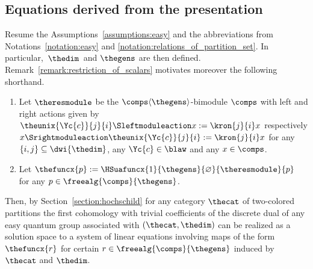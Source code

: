 \documentclass[pdftex]{sigma}
\numberwithin{equation}{section}
\begin{document}
\subsection{Equations derived from the presentation}
\label{section:main-one-equations}
 Resume the As\-sump\-tions~\ref{assumptions:easy} and the abbreviations from Notations~\ref{notation:easy} and \ref{notation:relations_of_partition_set}.  In particular,~$\thedim$~and $\thegens$ are then defined.
 Remark~\ref{remark:restriction_of_scalars} mo\-ti\-va\-tes moreover the fol\-lo\-wing short\-hand.

\begin{Notation}\quad
  \newcommand{\ascalar}{x}
  \newcommand{\acol}{\Yc{c}}
  \newcommand{\indi}{i}
  \newcommand{\indj}{j}
  \newcommand{\anypoly}{p}
  \newcommand{\thepolys}{\freealg{\comps}{\thegens}}
  \newcommand{\thepartition}{p}
  \newcommand{\thepartitionset}{\mathcal{S}}
  \newcommand{\incol}{\Yc{c}}
  \newcommand{\outcol}{\Yc{d}}
  \newcommand{\infree}{g}
  \newcommand{\outfree}{j}
  \begin{enumerate}
  \item Let
    $\theresmodule$ be the $\comps\langle\thegens\rangle$-bimodule  $\comps$ with left and right actions given by $\theunix{\acol}{\indj}{\indi}\Sleftmoduleaction \ascalar:= \kron{\indj}{\indi}\ascalar$ respectively $ \ascalar\Srightmoduleaction\theunix{\acol}{\indj}{\indi}:= \kron{\indj}{\indi}\ascalar$ for any $\{\indi,\indj\}\subseteq \dwi{\thedim}$, any $\acol\in\blaw$ and any $\ascalar\in\comps$.
\item Let $\thefuncx{\anypoly}:= \HSuafuncx{1}{\thegens}{\varnothing}{\theresmodule}{\anypoly}$ for any $\anypoly\in\thepolys$.
  \end{enumerate}
\end{Notation}
{
  \newcommand{\anypoly}{r}
  \newcommand{\thepolys}{\freealg{\comps}{\thegens}}
  Then, by Section~\ref{section:hochschild} for any category $\thecat$ of two-colored partitions the first cohomology with trivial coefficients of the discrete dual of any easy quantum group associated with $(\thecat,\thedim)$ can be realized as a solution space to a system of linear equations involving maps of the form $\thefuncx{\anypoly}$ for certain $\anypoly\in\thepolys$ induced by $\thecat$ and $\thedim$.
}
\end{document}
